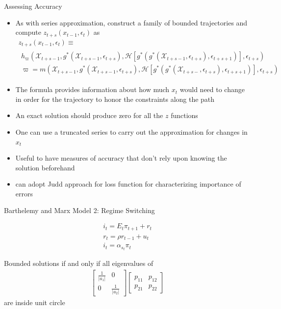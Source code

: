 \documentclass[12pt]{article}
\begin{document}
  {Assessing Accuracy}
{\small

  \begin{itemize}
  \item As with series approximation,
 construct a family of bounded trajectories and compute
$  z_{t+s}(x_{t-1},\epsilon_t)$ as  %
{
\begin{gather}
  z_{t+s}(x_{t-1},\epsilon_t) \equiv\\
   \begin{split}
 h_{\varpi}(\mathcal{X}_{t+s-1},g^\ast(\mathcal{X}_{t+s-1},\epsilon_{t+s}),\mathcal{H}[g^\ast(g^\ast(\mathcal{X}_{t+s-1},\epsilon_{t+s}),\epsilon_{t+s+1})],\epsilon_{t+s}) \label{theProblem} \\
\varpi= m(\mathcal{X}_{t+s-1},g^\ast(\mathcal{X}_{t+s-1},\epsilon_{t+s}),\mathcal{H}[g^\ast(g^\ast(\mathcal{X}_{t+s-},\epsilon_{t+s}),\epsilon_{t+s+1})],\epsilon_{t+s}) 
   \end{split}
  \end{gather}
}
\item The formula  provides information about how much $x_{t}$ would need
to change in order for the trajectory to honor the constraints along the path
\item An exact solution should produce zero for all the $z$ functions
\item One can use a truncated series to carry out the approximation for changes in $x_t$
\item Useful to have measures of accuracy that don't rely upon knowing the solution beforehand
\item can adopt Judd approach for loss function for characterizing importance of errors
  \end{itemize}
}


  {Barthelemy and Marx  Model 2: Regime Switching
\cite{marxbarthelemy2012}}


\cite{troy2007}
\begin{gather}
  \label{eq:4}
  i_t =E_t \pi_{t+1} + r_t\\
r_t= \rho r_{t-1} +u_t\\
i_t=\alpha_{s_t} \pi_t
\end{gather}

Bounded solutions if and only if all eigenvalues of 
\begin{gather}
  \label{eq:5}
  \begin{bmatrix}
    \frac{1}{|a_1|}&0\\
0&    \frac{1}{|a_2|}
  \end{bmatrix}
  \begin{bmatrix}
    p_{11}&p_{12}\\p_{21}&p_{22}
  \end{bmatrix}
\end{gather}
 are inside unit circle
\end{document}
